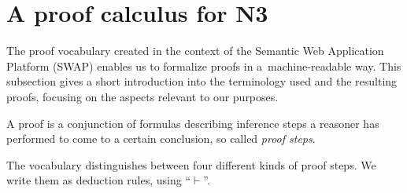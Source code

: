 \section{A proof calculus for N3}\label{cal}
\label{sec:ProofAnatomy}


The \nthree proof vocabulary created in the context of the Semantic Web Application Platform (SWAP) \cite{SWAP} enables us to formalize proofs in a~machine-readable way.
This subsection gives a short introduction into the terminology used and the resulting proofs,
focusing on the aspects relevant to our purposes.

A proof is a conjunction of \nthree formulas describing 
inference steps
a reasoner has performed to come to a certain conclusion, so called \textit{proof steps}. 




The vocabulary distinguishes between four different kinds of proof steps. We write them as deduction rules, using ``$\vdash$''.

